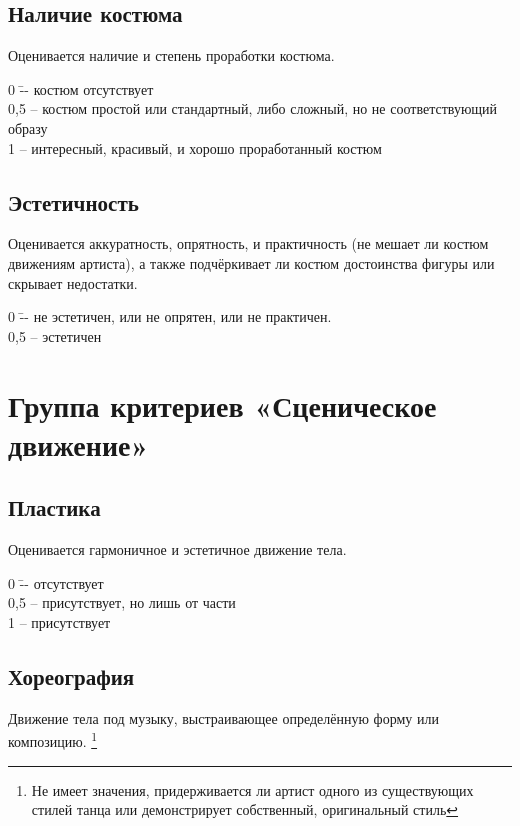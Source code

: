\documentclass[12pt]{article}
\begin{document}
\subsection{Наличие костюма} 

Оценивается наличие и степень проработки костюма.

\begin{tabbing}
0\hspace{0.8em}  \= -- костюм отсутствует\\
0,5 \>-- костюм простой или стандартный, либо сложный, но не соответствующий образу\\
1 \>-- интересный, красивый, и хорошо проработанный костюм
\end{tabbing}


\subsection{Эстетичность} 
Оценивается аккуратность, опрятность, и практичность (не мешает ли костюм движениям артиста), а также подчёркивает ли костюм достоинства фигуры или скрывает недостатки.

\begin{tabbing}
0\hspace{0.8em}  \= -- не эстетичен, или не опрятен, или не практичен.\\
0,5 \>-- эстетичен
\end{tabbing}


\section{Группа критериев «Сценическое движение»}

\subsection{Пластика}
Оценивается гармоничное и эстетичное движение тела.

\begin{tabbing}
0\hspace{0.8em}  \= -- отсутствует\\
0,5 \>-- присутствует, но лишь от части\\
1 \>-- присутствует
\end{tabbing}


\subsection{Хореография} 
Движение тела под музыку, выстраивающее определённую форму или композицию.
\footnote{Не имеет значения, придерживается ли артист одного из существующих стилей танца или демонстрирует собственный, оригинальный стиль}
\end{document}
